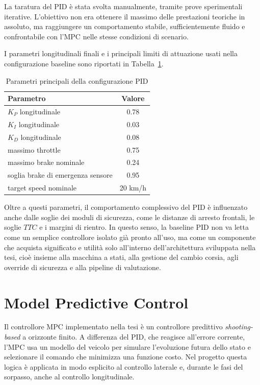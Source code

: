 La taratura del PID è stata svolta manualmente, tramite prove sperimentali iterative. L'obiettivo non era ottenere il massimo delle prestazioni teoriche in assoluto, ma raggiungere un comportamento stabile, sufficientemente fluido e confrontabile con l'MPC nelle stesse condizioni di scenario.

I parametri longitudinali finali e i principali limiti di attuazione usati nella configurazione baseline sono riportati in Tabella~\ref{tab:pid-params}.

\begin{table}[H]
    \centering
    \caption{Parametri principali della configurazione PID}
    \label{tab:pid-params}
    \begin{tabular}{lc}
        \toprule
        \textbf{Parametro} & \textbf{Valore} \\
        \midrule
        \(K_P\) longitudinale & 0.78 \\
        \(K_I\) longitudinale & 0.03 \\
        \(K_D\) longitudinale & 0.08 \\
        massimo throttle & 0.75 \\
        massimo brake nominale & 0.24 \\
        soglia brake di emergenza sensore & 0.95 \\
        target speed nominale & 20 km/h \\
        \bottomrule
    \end{tabular}
\end{table}

Oltre a questi parametri, il comportamento complessivo del PID è influenzato anche dalle soglie dei moduli di sicurezza, come le distanze di arresto frontali, le soglie \(TTC\) e i margini di rientro. In questo senso, la baseline PID non va letta come un semplice controllore isolato già pronto all'uso, ma come un componente che acquista significato e utilità solo all'interno dell'architettura sviluppata nella tesi, cioè insieme alla macchina a stati, alla gestione del cambio corsia, agli override di sicurezza e alla pipeline di valutazione.

\section{Model Predictive Control}

Il controllore MPC implementato nella tesi è un controllore predittivo \emph{shooting-based} a orizzonte finito. A differenza del PID, che reagisce all'errore corrente, l'MPC usa un modello del veicolo per simulare l'evoluzione futura dello stato e selezionare il comando che minimizza una funzione costo. Nel progetto questa logica è applicata in modo esplicito al controllo laterale e, durante le fasi del sorpasso, anche al controllo longitudinale.

